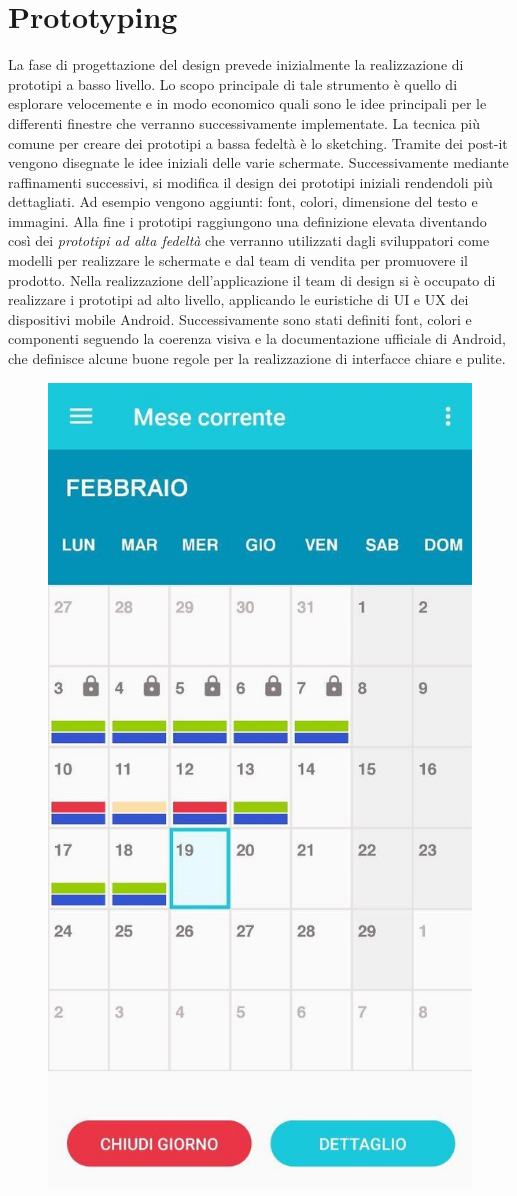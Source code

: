 \documentclass[12pt]{report}
\begin{document}
\section{Prototyping}
La fase di progettazione del design prevede inizialmente la realizzazione di prototipi a basso livello.
Lo scopo principale di tale strumento è quello di esplorare velocemente e in modo economico quali sono le idee principali per le differenti finestre che verranno successivamente implementate. La tecnica più comune per creare dei prototipi a bassa fedeltà è lo sketching. Tramite dei post-it vengono disegnate le idee iniziali delle varie schermate. Successivamente mediante raffinamenti successivi, si modifica il design dei prototipi iniziali rendendoli più dettagliati. Ad esempio vengono aggiunti: font, colori, dimensione del testo e immagini. Alla fine i prototipi raggiungono una definizione elevata diventando così dei \textit{prototipi ad alta fedeltà} che verranno utilizzati dagli sviluppatori come modelli per realizzare le schermate e dal team di vendita per promuovere il prodotto. Nella realizzazione dell'applicazione il team di design si è occupato di realizzare i prototipi ad alto livello, applicando le euristiche di UI e UX dei dispositivi mobile Android. Successivamente sono stati definiti font, colori e componenti seguendo la coerenza visiva e la documentazione ufficiale di Android\cite{Material}, che definisce alcune buone regole per la realizzazione di interfacce chiare e pulite. \\
\newpage
\begin{figure}[h!]
	\centering
	\includegraphics[width=0.35\linewidth]{immagini/home}
	\caption{}
\end{figure}
\end{document}
